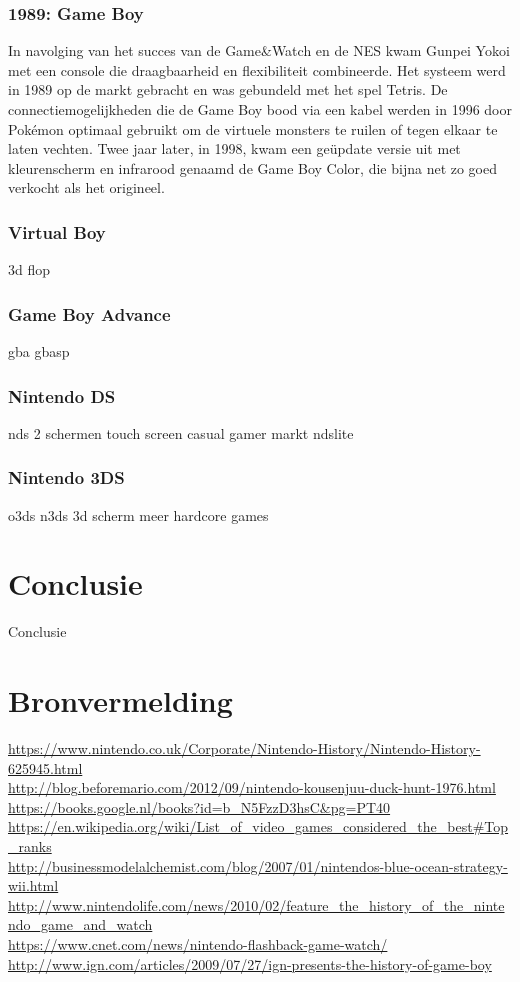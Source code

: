 \documentclass{article}
\begin{document}
\subsubsection{1989: Game Boy}
In navolging van het succes van de Game\&Watch en de NES kwam Gunpei Yokoi met een console die draagbaarheid en flexibiliteit combineerde. Het systeem werd in 1989 op de markt gebracht en was gebundeld met het spel Tetris. De connectiemogelijkheden die de Game Boy bood via een kabel werden in 1996 door Pok\'emon optimaal gebruikt om de virtuele monsters te ruilen of tegen elkaar te laten vechten. Twee jaar later, in 1998, kwam een ge\"update versie uit met kleurenscherm en infrarood genaamd de Game Boy Color, die bijna net zo goed verkocht als het origineel.
\subsubsection{Virtual Boy}
3d
flop
\subsubsection{Game Boy Advance}
gba
gbasp
\subsubsection{Nintendo DS}
nds
2 schermen
touch screen
casual gamer markt 
ndslite
\subsubsection{Nintendo 3DS}
o3ds
n3ds
3d scherm
meer hardcore games

\section{Conclusie}
Conclusie
\section{Bronvermelding}
\url{https://www.nintendo.co.uk/Corporate/Nintendo-History/Nintendo-History-625945.html}\\ 
\url{http://blog.beforemario.com/2012/09/nintendo-kousenjuu-duck-hunt-1976.html}\\ 
\url{https://books.google.nl/books?id=b_N5FzzD3hsC&pg=PT40}\\ 
\url{https://en.wikipedia.org/wiki/List_of_video_games_considered_the_best#Top_ranks}\\ 
\url{http://businessmodelalchemist.com/blog/2007/01/nintendos-blue-ocean-strategy-wii.html}\\ 
\url{http://www.nintendolife.com/news/2010/02/feature_the_history_of_the_nintendo_game_and_watch}\\ 
\url{https://www.cnet.com/news/nintendo-flashback-game-watch/}\\ 
\url{http://www.ign.com/articles/2009/07/27/ign-presents-the-history-of-game-boy}\\ 
\end{document}
